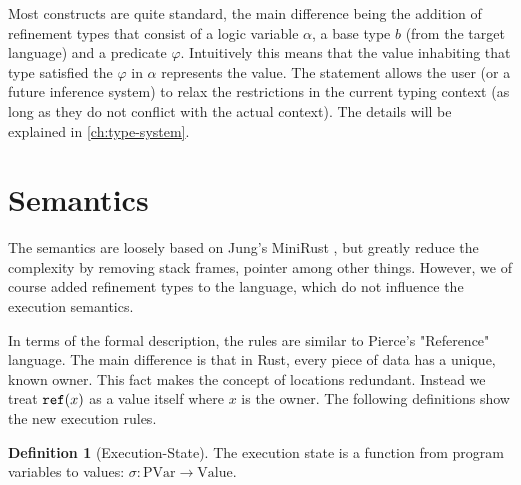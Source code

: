 \documentclass[twoside, english, final]{sdqthesis}
\theoremstyle{definition}
\newtheorem{definition}[theorem]{Definition}
\begin{document}
Most constructs are quite standard, the main difference being the addition of refinement types that consist of a logic variable $\alpha$, a base type $b$ (from the target language) and a predicate $\varphi$. Intuitively this means that the value inhabiting that type satisfied the $\varphi$ in $\alpha$ represents the value. 
The statement  allows the user (or a future inference system) to relax the restrictions in the current typing context (as long as they do not conflict with the actual context). The details will be explained in \cref{ch:type-system}.


\section{Semantics}


The semantics are loosely based on Jung's MiniRust \cite{jung_minirust_2022}, but greatly reduce the complexity by removing stack frames, pointer among other things.
However, we of course added refinement types to the language, which do not influence the execution semantics.

In terms of the formal description, the rules are similar to Pierce's \cite[p. 166f]{pierce_types_2002-3} "Reference" language. %
The main difference is that in Rust, every piece of data has a unique, known owner. This fact makes the concept of locations redundant. Instead we treat $\code{ref}(x)$ as a value itself where $x$ is the owner. The following definitions show the new execution rules.

\begin{definition}[Execution-State]
  The execution state is a function from program variables to values: $\sigma : \text{PVar} \rightarrow \text{Value}$. 
\end{definition}
\end{document}
